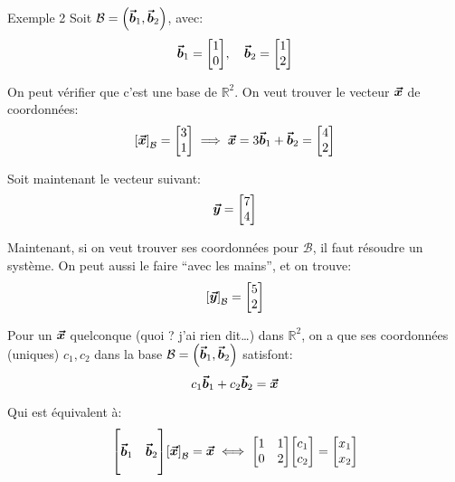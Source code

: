 \documentclass[a4paper]{article}
\begin{document}
\begin{parag}{Exemple 2}
    Soit $\mathcal{B} = \left(\bvec{b}_1, \bvec{b}_2\right)$, avec:
    \[\bvec{b}_1 = \begin{bmatrix} 1 \\ 0 \end{bmatrix}, \mathspace \bvec{b}_2 = \begin{bmatrix} 1 \\ 2 \end{bmatrix} \]

    On peut vérifier que c'est une base de $\mathbb{R}^2$. On veut trouver le vecteur $\bm{\protect\vec{x}}$ de coordonnées:
    \[\left[\bvec{x}\right]_{\mathcal{B}} = \begin{bmatrix} 3 \\ 1 \end{bmatrix} \implies \bvec{x} = 3\bvec{b}_1 + \bvec{b}_2 = \begin{bmatrix} 4 \\ 2 \end{bmatrix}\]

    Soit maintenant le vecteur suivant:
    \[\bm{\protect\vec{y}} = \begin{bmatrix} 7 \\ 4 \end{bmatrix} \]

    Maintenant, si on veut trouver ses coordonnées pour $\mathcal{B}$, il faut résoudre un système. On peut aussi le faire ``avec les mains'', et on trouve:
    \[\left[\bvec{y}\right]_{\mathcal{B}} = \begin{bmatrix} 5 \\ 2 \end{bmatrix} \]

    Pour un $\bm{\protect\vec{x}}$ quelconque (quoi ? j'ai rien dit\ldots) dans $\mathbb{R}^2$, on a que ses coordonnées (uniques) $c_1, c_2$ dans la base $\mathcal{B} = \left(\bvec{b}_1, \bvec{b}_2\right)$ satisfont:
    \[c_1 \bm{\protect\vec{b}}_1 + c_2 \bm{\protect\vec{b}}_2 = \bm{\protect\vec{x}} \]

    Qui est équivalent à:
    \[\begin{bmatrix} & \\ \bvec{b}_1 & \bvec{b}_2 \\ & \end{bmatrix}  \left[\bvec{x}\right]_{\mathcal{B}} = \bvec{x} \iff \begin{bmatrix} 1 & 1 \\ 0 & 2 \end{bmatrix} \begin{bmatrix} c_1 \\ c_2 \end{bmatrix} = \begin{bmatrix} x_1 \\ x_2 \end{bmatrix} \]


\end{parag}
\end{document}
